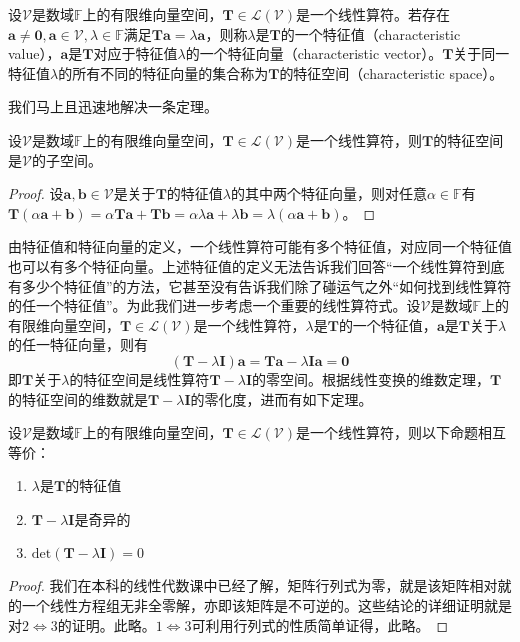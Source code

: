 \documentclass[main.tex]{subfiles}
\begin{document}
\begin{definition}
设$\mathcal{V}$是数域$\mathbb{F}$上的有限维向量空间，$\mathbf{T}\in\mathcal{L}\left(\mathcal{V}\right)$是一个线性算符。若存在$\mathbf{a}\neq\mathbf{0},\mathbf{a}\in\mathcal{V},\lambda\in\mathbb{F}$满足$\mathbf{Ta}=\lambda\mathbf{a}$，则称$\lambda$是$\mathbf{T}$的一个特征值（characteristic value），$\mathbf{a}$是$\mathbf{T}$对应于特征值$\lambda$的一个特征向量（characteristic vector）。$\mathbf{T}$关于同一特征值$\lambda$的所有不同的特征向量的集合称为$\mathbf{T}$的特征空间（characteristic space）。
\end{definition}

我们马上且迅速地解决一条定理。

\begin{theorem}
设$\mathcal{V}$是数域$\mathbb{F}$上的有限维向量空间，$\mathbf{T}\in\mathcal{L}\left(\mathcal{V}\right)$是一个线性算符，则$\mathbf{T}$的特征空间是$\mathcal{V}$的子空间。
\end{theorem}
\begin{proof}
设$\mathbf{a},\mathbf{b}\in\mathcal{V}$是关于$\mathbf{T}$的特征值$\lambda$的其中两个特征向量，则对任意$\alpha\in\mathbb{F}$有$\mathbf{T}\left(\alpha\mathbf{a}+\mathbf{b}\right)=\alpha\mathbf{Ta}+\mathbf{Tb}=\alpha\lambda\mathbf{a}+\lambda\mathbf{b}=\lambda\left(\alpha\mathbf{a}+\mathbf{b}\right)$。
\end{proof}

由特征值和特征向量的定义，一个线性算符可能有多个特征值，对应同一个特征值也可以有多个特征向量。上述特征值的定义无法告诉我们回答“一个线性算符到底有多少个特征值”的方法，它甚至没有告诉我们除了碰运气之外“如何找到线性算符的任一个特征值”。为此我们进一步考虑一个重要的线性算符式。设$\mathcal{V}$是数域$\mathbb{F}$上的有限维向量空间，$\mathbf{T}\in\mathcal{L}\left(\mathcal{V}\right)$是一个线性算符，$\lambda$是$\mathbf{T}$的一个特征值，$\mathbf{a}$是$\mathbf{T}$关于$\lambda$的任一特征向量，则有
\[\left(\mathbf{T}-\lambda\mathbf{I}\right)\mathbf{a}=\mathbf{Ta}-\lambda\mathbf{Ia}=\mathbf{0}\]
即$\mathbf{T}$关于$\lambda$的特征空间是线性算符$\mathbf{T}-\lambda\mathbf{I}$的零空间。根据线性变换的维数定理，$\mathbf{T}$的特征空间的维数就是$\mathbf{T}-\lambda\mathbf{I}$的零化度，进而有如下定理。

\begin{theorem}
设$\mathcal{V}$是数域$\mathbb{F}$上的有限维向量空间，$\mathbf{T}\in\mathcal{L}\left(\mathcal{V}\right)$是一个线性算符，则以下命题相互等价：
\begin{enumerate}
    \item $\lambda$是$\mathbf{T}$的特征值
    \item $\mathbf{T}-\lambda\mathbf{I}$是奇异的
    \item $\mathrm{det}\left(\mathbf{T}-\lambda\mathbf{I}\right)=0$
\end{enumerate}
\begin{proof}
我们在本科的线性代数课中已经了解，矩阵行列式为零，就是该矩阵相对就的一个线性方程组无非全零解，亦即该矩阵是不可逆的。这些结论的详细证明就是对$2\Leftrightarrow 3$的证明。此略。$1\Leftrightarrow 3$可利用行列式的性质简单证得，此略。
\end{proof}
\end{theorem}
\end{document}

